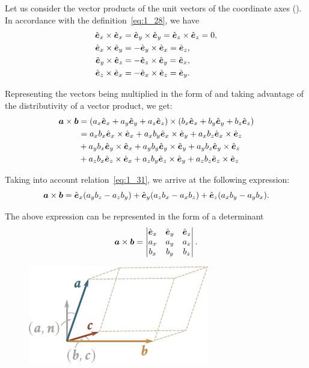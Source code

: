 Let us consider the vector products of the unit vectors of the coordinate axes (). In accordance with the definition~\eqref{eq:1_28}, we have
\begin{align}
\vecuniprod{x}{x} &= \vecuniprod{y}{y} = \vecuniprod{z}{z} = 0,\nonumber\\
\vecuniprod{x}{y} &= -\vecuniprod{y}{x} = \vecuni{z},\label{eq:1_31}\\
\vecuniprod{y}{z} &= -\vecuniprod{z}{y} = \vecuni{x},\nonumber\\
\vecuniprod{z}{x} &= -\vecuniprod{x}{z} = \vecuni{y}.\nonumber
\end{align}

\noindent
Representing the vectors being multiplied in the form of  and taking advantage of the distributivity of a vector product, we get:
\begin{align*}
\vecprod{a}{b} &= (a_x\vecuni{x}+a_y\vecuni{y}+a_z\vecuni{z})\times(b_x\vecuni{x}+b_y\vecuni{y}+b_z\vecuni{z})\\
&= a_xb_x\vecuniprod{x}{x} + a_xb_y\vecuniprod{x}{y} + a_xb_z\vecuniprod{x}{z}\\
&+ a_yb_x\vecuniprod{y}{x} + a_yb_y\vecuniprod{y}{y} + a_yb_z\vecuniprod{y}{z}\\
&+ a_zb_x\vecuniprod{z}{x} + a_zb_y\vecuniprod{z}{y} + a_zb_z\vecuniprod{z}{z}
\end{align*}

\noindent
Taking into account relation~\eqref{eq:1_31}, we arrive at the following expression:
\begin{equation}\label{eq:1_32}
\vecprod{a}{b} = \vecuni{x}(a_yb_z - a_zb_y) + \vecuni{y}(a_zb_x - a_xb_z) + \vecuni{z}(a_xb_y - a_yb_x).
\end{equation}

\noindent
The above expression can be represented in the form of a determinant
\begin{equation}\label{eq:1_33}
\vecprod{a}{b} = \begin{vmatrix}
\vecuni{x} & \vecuni{y} & \vecuni{z}\\
a_x & a_y & a_z\\
b_x & b_y & b_z
\end{vmatrix}.
\end{equation}

\begin{figure}[t]
	\begin{center}
		\includegraphics[scale=1]{figures/ch_01/fig_1_18.pdf}
		\caption[]{}
		\label{fig:1_18}
	\end{center}
	\vspace{-0.7cm}
\end{figure}

